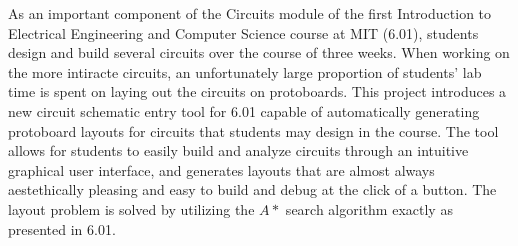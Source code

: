 % 
% 
%

As an important component of the Circuits module of the first Introduction to
Electrical Engineering and Computer Science course at MIT (6.01), students
design and
build several circuits over the course of three weeks. When working on the
more intiracte circuits, an unfortunately large proportion of students' lab time
is spent on laying out the circuits on protoboards. This project introduces a
new circuit schematic entry tool for 6.01 capable of automatically generating
protoboard layouts for circuits that students may design in the course. The tool
allows for students to easily build and analyze circuits through an intuitive
graphical user interface, and generates layouts that are almost always
aestethically pleasing and easy to build and debug at the click of a button.
The layout problem is solved by utilizing the $A*$ search algorithm exactly as
presented in 6.01.
